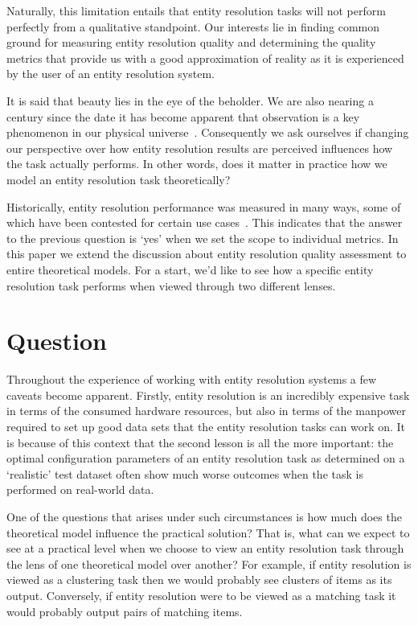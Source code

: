 \documentclass[lettersize,journal]{IEEEtran}
\begin{document}
    Naturally, this limitation entails that entity resolution tasks will not
    perform perfectly from a qualitative standpoint.
    Our interests lie in finding common ground for measuring entity resolution
    quality and determining the quality metrics that provide us with a good
    approximation of reality as it is experienced by the user of an entity
    resolution system.

    It is said that beauty lies in the eye of the beholder.
    We are also nearing a century since the date it has become apparent that
    observation is a key phenomenon in our physical universe~\cite{schodinger1926}.
    Consequently we ask ourselves if changing our perspective over how entity
    resolution results are perceived influences how the task actually performs.
    In other words, does it matter in practice how we model an entity resolution
    task theoretically?

    Historically, entity resolution performance was measured in many ways, some
    of which have been contested for certain use cases~\cite{Goga2015}.
    This indicates that the answer to the previous question is `yes' when we set
    the scope to individual metrics.
    In this paper we extend the discussion about entity resolution quality
    assessment to entire theoretical models.
    For a start, we'd like to see how a specific entity resolution task performs
    when viewed through two different lenses.

    \section{Question}\label{sec:contributions}

    Throughout the experience of working with entity resolution systems a few
    caveats become apparent.
    Firstly, entity resolution is an incredibly expensive task in terms of the
    consumed hardware resources, but also in terms of the manpower required to
    set up good data sets that the entity resolution tasks can work on.
    It is because of this context that the second lesson is all the more
    important: the optimal configuration parameters of an entity resolution task
    as determined on a `realistic' test dataset often show much worse outcomes
    when the task is performed on real-world data.

    One of the questions that arises under such circumstances is how much does
    the theoretical model influence the practical solution?
    That is, what can we expect to see at a practical level when we choose to
    view an entity resolution task through the lens of one theoretical model
    over another?
    For example, if entity resolution is viewed as a clustering task then we
    would probably see clusters of items as its output.
    Conversely, if entity resolution were to be viewed as a matching task it
    would probably output pairs of matching items.
\end{document}
